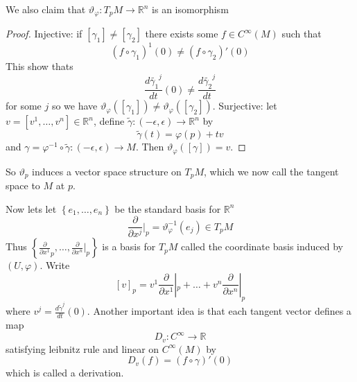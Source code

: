 \documentclass[a4paper]{article}
\begin{document}
We also claim that $\vartheta_{\varphi}: T_pM \rightarrow \mathds{R}^n$ is an isomorphism
\begin{proof}
    Injective: if $[\gamma_1] \neq [\gamma_2]$ there exists some $f \in C^{\infty}(M)$ such that 
    \[
        (f \circ \gamma_1)^1(0) \neq (f \circ \gamma_2)'(0)
    \]
    This show thats 
    \[
        \frac{d \tilde{\gamma_1}^j}{dt}(0) \neq \frac{d \tilde{\gamma_2}^j}{dt}
    \]
    for some $j$ so we have $\vartheta_{\varphi}([\gamma_1]) \neq \vartheta_{\varphi}([\gamma_2])$.
    Surjective: let $v = [v^1, \dots, v^n] \in \mathds{R}^n$, define $\tilde{\gamma}:(-\epsilon, \epsilon) \rightarrow \mathds{R}^n$ by 
    \[
        \tilde{\gamma}(t) = \varphi(p) + tv
    \]
    and $\gamma = \varphi^{-1} \circ \tilde{\gamma}: (-\epsilon, \epsilon) \rightarrow M$. Then $\vartheta_{\varphi}([\gamma]) = v$.
\end{proof}
So $\vartheta_p$ induces a vector space structure on $T_pM$, which we now call the tangent space to $M$ at $p$.

Now lets let $ \left\{ e_1, \dots, e_n \right\}$ be the standard basis for $\mathds{R}^n$
\[
    \frac{\partial}{\partial x^j}|_p = \vartheta_{\varphi}^{-1}(e_j) \in T_pM
\]
Thus $\left\{\frac{\partial}{\partial x^1}_p, \dots, \frac{\partial}{\partial x^n}|_p\right\}$ is a basis for $T_pM$ called the coordinate basis induced by $(U, \varphi)$.
Write
\[
    [v]_p = v^1 \frac{\partial}{\partial x^1} |_p + \dots + v^n \frac{\partial}{\partial x^n}|_p
\]
where $v^j = \frac{d \tilde{\gamma}^j}{dt}(0)$. Another important idea is that each tangent vector defines a map
\[
    D_v: C^{\infty} \rightarrow \mathds{R}
\]
satisfying leibnitz rule and linear on $C^{\infty}(M)$ by 
\[
    D_v(f) = (f \circ \gamma)'(0)
\]
which is called a derivation.
\end{document}
